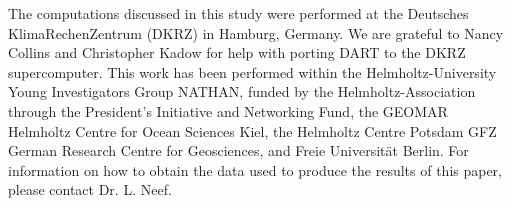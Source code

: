 The computations discussed in this study were performed at the Deutsches KlimaRechenZentrum (DKRZ) in Hamburg, Germany.
We are grateful to 
Nancy Collins and Christopher Kadow for help with porting DART to the DKRZ supercomputer.
This work has been performed within the Helmholtz-University Young Investigators Group NATHAN, funded by the Helmholtz-Association through the President's Initiative and Networking Fund, the GEOMAR Helmholtz Centre for Ocean Sciences Kiel, the Helmholtz Centre Potsdam GFZ German Research Centre for Geosciences, and Freie Universit\"at Berlin.
For information on how to obtain the data used to produce the results of this paper, please contact Dr. L. Neef.

